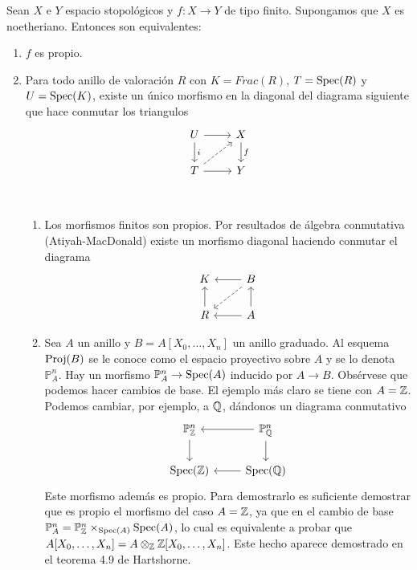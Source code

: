 \documentclass[GA.tex]{subfiles}
\begin{document}
\begin{prop}
Sean $X$ e $Y$ espacio stopológicos y $f:X\to Y$ de tipo finito. Supongamos que $X$ es noetheriano. Entonces son equivalentes:
\begin{enumerate}
\item $f$ es propio.
\item Para todo anillo de valoración $R$ con $K=Frac(R)$, $T=\operatorname{Spec}(R)$ y $U=\operatorname{Spec}(K)$, existe un único morfismo en la diagonal del diagrama siguiente que hace conmutar los triangulos
\[
\begin{tikzcd}
U\arrow[r] \arrow[d, "i"]& X\arrow[d, "f"]\\
T\arrow[r]\arrow[ur, dashed] & Y
\end{tikzcd}
\]

\begin{ej}\
\begin{enumerate}
\item Los morfismos finitos son propios. Por resultados de álgebra conmutativa (Atiyah-MacDonald) existe un morfismo diagonal haciendo conmutar el diagrama
\[
\begin{tikzcd}
K & B\arrow[l]\arrow[dl, dashed]\\
R\arrow[u] & A\arrow[u]\arrow[l]
\end{tikzcd}
\]
\item Sea $A$ un anillo y $B=A[X_0,\dots, X_n]$ un anillo graduado. Al esquema $\operatorname{Proj}(B)$ se le conoce como el espacio proyectivo sobre $A$ y se lo denota $\mathbb{P}_A^n$. Hay un morfismo $\mathbb{P}_A^n\to\operatorname{Spec}(A)$ inducido por $A\to B$. Obsérvese que podemos hacer cambios de base. El ejemplo más claro se tiene con $A=\mathbb{Z}$. Podemos cambiar, por ejemplo, a $\mathbb{Q}$, dándonos un diagrama conmutativo
\[
\begin{tikzcd}
\PP_{\Z}^n\arrow[d] & \PP_\Q^n\arrow[l]\arrow[d]\\
\spec(\Z) & \spec(\Q)\arrow[l]
\end{tikzcd}
\]
Este morfismo además es propio. Para demostrarlo es suficiente demostrar que es propio el morfismo del caso $A=\mathbb{Z}$, ya que en el cambio de base $\mathbb{P}_A^n=\mathbb{P}_{\mathbb{Z}}^n\times_{\operatorname{Spec}(A)}\operatorname{Spec}(A)$, lo cual es equivalente a probar que $A[X_0,\dots, X_n]=A\otimes_{\mathbb{Z}} \mathbb{Z}[X_0,\dots,X_n]$. Este hecho aparece demostrado en el teorema 4.9 de Hartshorne.
\end{enumerate}
\end{ej}
\end{enumerate}
\end{prop}
\end{document}
